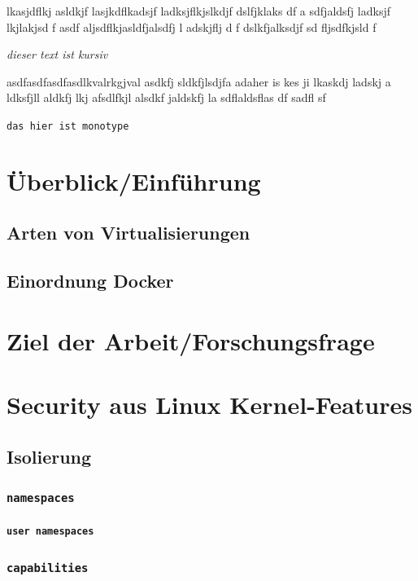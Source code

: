 \documentclass[11pt,a4paper,oneside]{report}
\begin{document}
lkasjdflkj asldkjf lasjkdflkadsjf ladksjflkjslkdjf    dslfjklaks df a sdfjaldsfj  ladksjf lkjlakjsd f asdf aljsdflkjasldfjalsdfj l adskjflj d f dslkfjalksdjf sd fljsdfkjsld f

\emph{dieser text ist kursiv}

asdfasdfasdfasdlkvalrkgjval  asdkfj  sldkfjlsdjfa adaher is kes ji lkaskdj ladskj a ldksfjll aldkfj lkj afsdlfkjl alsdkf jaldskfj la sdflaldsflas df sadfl sf

\texttt{das hier ist monotype}



\chapter{Überblick/Einführung}
	\section{Arten von Virtualisierungen}
	\section{Einordnung Docker}
\chapter{Ziel der Arbeit/Forschungsfrage}
\chapter{Security aus Linux Kernel-Features}
	\section{Isolierung}
		\subsection{\texttt{namespaces}}
			\subsubsection{\texttt{user namespaces}}
		\subsection{\texttt{capabilities}}
\end{document}
